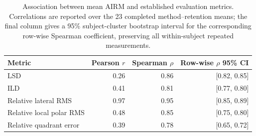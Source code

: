 \begin{table}[ht!]
\centering
\caption{Association between mean AIRM and established evaluation metrics. Correlations are reported over the 23 completed method--retention means; the final column gives a 95\% subject-cluster bootstrap interval for the corresponding row-wise Spearman coefficient, preserving all within-subject repeated measurements.}
\label{tab:metric_correlations}
\small
\begin{tabular}{lrrr}
\toprule
Metric & Pearson $r$ & Spearman $\rho$ & Row-wise $\rho$ 95\% CI \\
\midrule
LSD & 0.26 & 0.86 & [0.82, 0.85] \\
ILD & 0.41 & 0.81 & [0.77, 0.80] \\
Relative lateral RMS & 0.97 & 0.95 & [0.85, 0.89] \\
Relative local polar RMS & 0.48 & 0.85 & [0.75, 0.80] \\
Relative quadrant error & 0.39 & 0.78 & [0.65, 0.72] \\
\bottomrule
\end{tabular}
\end{table}
